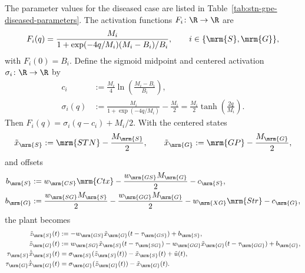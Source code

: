 The parameter values for the diseased case are
listed in Table~\ref{tab:stn-gpe-diseased-parameters}.
The activation functions $F_i\colon\R\to\R$ are
\begin{equation}\label{eq:stn-gpe-uncentered-sigmoid}
F_i(q)=\frac{M_i}{1+\exp(-4q/M_i)(M_i-B_i)/B_i},
\qquad i\in\{\mrm{S},\mrm{G}\},
\end{equation}
with $F_i(0)=B_i$. Define the sigmoid midpoint and centered activation
$\sigma_i\colon\R\to\R$ by
\begin{equation}\label{eq:stn-gpe-centered-sigmoid}
\begin{aligned}
c_i&:=\frac{M_i}{4}\ln\!\left(\frac{M_i-B_i}{B_i}\right),\\
\sigma_i(q)&:=\frac{M_i}{1+\exp(-4q/M_i)}-\frac{M_i}{2}=\frac{M_i}{2}\tanh\!\left(\frac{2q}{M_i}\right).
\end{aligned}
\end{equation}
Then $F_i(q)=\sigma_i(q-c_i)+M_i/2$. With the centered states
\begin{equation*}
\tilde{x}_{\mrm{S}}:=\mrm{STN}-\frac{M_{\mrm{S}}}{2},
\qquad
\tilde{x}_{\mrm{G}}:=\mrm{GP}-\frac{M_{\mrm{G}}}{2},
\end{equation*}
and offsets
\begin{equation*}
\begin{aligned}
b_{\mrm{S}}&:=w_{\mrm{CS}}\mrm{Ctx}-\frac{w_{\mrm{GS}}M_{\mrm{G}}}{2}-c_{\mrm{S}},\\
b_{\mrm{G}}&:=\frac{w_{\mrm{SG}}M_{\mrm{S}}}{2}-\frac{w_{\mrm{GG}}M_{\mrm{G}}}{2}
      -w_{\mrm{XG}}\mrm{Str}-c_{\mrm{G}},
\end{aligned}
\end{equation*}
the plant becomes
\begin{equation}\label{eq:stn-gpe-centered}
\begin{aligned}
\tilde{z}_{\mrm{S}}(t)&:=-w_{\mrm{GS}}\tilde{x}_{\mrm{G}}(t-\tau_{\mrm{GS}})+b_{\mrm{S}},\\
\tilde{z}_{\mrm{G}}(t)&:=w_{\mrm{SG}}\tilde{x}_{\mrm{S}}(t-\tau_{\mrm{SG}})
          -w_{\mrm{GG}}\tilde{x}_{\mrm{G}}(t-\tau_{\mrm{GG}})+b_{\mrm{G}},\\
\tau_{\mrm{S}}\dot{\tilde{x}}_{\mrm{S}}(t)
      &=\sigma_{\mrm{S}}(\tilde{z}_{\mrm{S}}(t))
        -\tilde{x}_{\mrm{S}}(t)+\tilde{u}(t),\\
\tau_{\mrm{G}}\dot{\tilde{x}}_{\mrm{G}}(t)
      &=\sigma_{\mrm{G}}(\tilde{z}_{\mrm{G}}(t))
        -\tilde{x}_{\mrm{G}}(t).
\end{aligned}
\end{equation}
